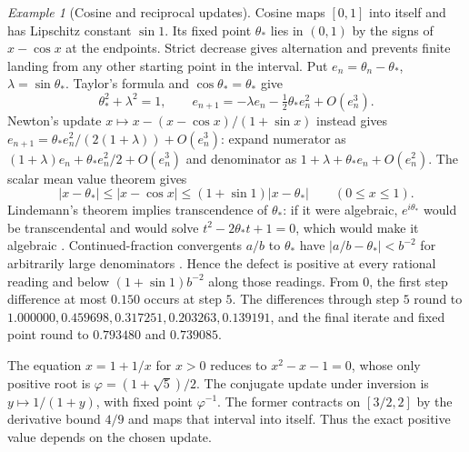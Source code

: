 \documentclass[11pt,reqno]{amsart}
\theoremstyle{definition}
\theoremstyle{remark}
\newtheorem{example}[theorem]{Example}
\numberwithin{equation}{section}
\begin{document}
\begin{example}[Cosine and reciprocal updates]\label{d4:cosine}
Cosine maps \([0,1]\) into itself and has Lipschitz constant \(\sin 1\).
Its fixed point \(\theta_*\) lies in \((0,1)\) by the signs of
\(x-\cos x\) at the endpoints. Strict decrease gives alternation and
prevents finite landing from any other starting point in the interval.
Put \(e_n=\theta_n-\theta_*\), \(\lambda=\sin\theta_*\). Taylor's formula
and \(\cos\theta_*=\theta_*\) give
\[
 \theta_*^2+\lambda^2=1,\qquad
 e_{n+1}=-\lambda e_n-\tfrac12\theta_* e_n^2+O(e_n^3).
\]
Newton's update \(x\mapsto x-(x-\cos x)/(1+\sin x)\) instead gives
\(e_{n+1}=\theta_*e_n^2/(2(1+\lambda))+O(e_n^3)\): expand numerator as
\((1+\lambda)e_n+\theta_*e_n^2/2+O(e_n^3)\) and denominator as
\(1+\lambda+\theta_*e_n+O(e_n^2)\). The scalar mean value theorem gives
\[
 |x-\theta_*|\le |x-\cos x|\le(1+\sin 1)|x-\theta_*|
 \qquad(0\le x\le1).
\]
Lindemann's theorem implies transcendence of \(\theta_*\): if it were
algebraic, \(e^{i\theta_*}\) would be transcendental and would solve
\(t^2-2\theta_*t+1=0\), which would make it algebraic
\cite{d4-lindemann}. Continued-fraction convergents \(a/b\) to
\(\theta_*\) have \(|a/b-\theta_*|<b^{-2}\) for arbitrarily large
denominators \cite[Ch.~X]{d4-hw}. Hence the defect is positive at every
rational reading and below \((1+\sin 1)b^{-2}\) along those readings.
From \(0\), the first step difference at most \(0.150\) occurs at step
\(5\). The differences through step \(5\) round to
\(1.000000,0.459698,0.317251,0.203263,0.139191\), and the final iterate
and fixed point round to \(0.793480\) and \(0.739085\).

The equation \(x=1+1/x\) for \(x>0\) reduces to \(x^2-x-1=0\), whose
only positive root is \(\varphi=(1+\sqrt5)/2\). The conjugate update
under inversion is \(y\mapsto1/(1+y)\), with fixed point
\(\varphi^{-1}\). The former contracts on \([3/2,2]\) by the derivative
bound \(4/9\) and maps that interval into itself. Thus the exact
positive value depends on the chosen update.
\end{example}
\end{document}
